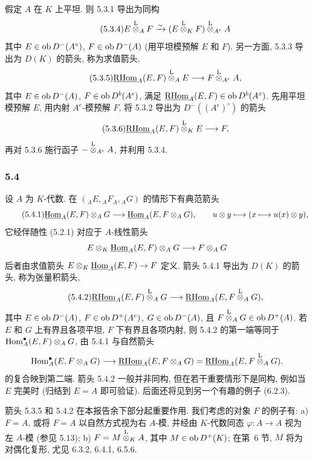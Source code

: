 假定 $A$ 在 $K$ 上平坦. 则 5.3.1 导出为同构
\begin{equation}\tag{5.3.4}
E\overset{\mathrm L}{\otimes}_AF\xrightarrow{\sim}(E\overset{\mathrm L}{\otimes}_KF)\overset{\mathrm L}{\otimes}_{A^e}A
\end{equation}
其中 $E\in\operatorname{ob} D^-(A^\circ)$, $F\in\operatorname{ob} D^-(A)$ (用平坦模预解 $E$ 和 $F$). 另一方面, 5.3.3 导出为 $D(K)$ 的箭头, 称为求值箭头,
\begin{equation}\tag{5.3.5}
\underline{\mathrm{RHom}}_A(E,F)\overset{\mathrm L}{\otimes}_AE\longrightarrow F\overset{\mathrm L}{\otimes}_{A^e}A,
\end{equation}
其中 $E\in\operatorname{ob} D^-(A)$, $F\in\operatorname{ob} D^b(A^e)$, 满足 $\underline{\mathrm{RHom}}_A(E,F)\in\operatorname{ob} D^b(A^\circ)$. 先用平坦模预解 $E$, 用内射 $A^e$-模预解 $F$, 将 5.3.2 导出为 $D^-((A^e)^\circ)$ 的箭头
\begin{equation}\tag{5.3.6}
\underline{\mathrm{RHom}}_A(E,F)\overset{\mathrm L}{\otimes}_KE\longrightarrow F,
\end{equation}
再对 5.3.6 施行函子 $-\overset{\mathrm L}{\otimes}_{A^e}A$, 并利用 5.3.4.

\subsubsection*{5.4}

设 $A$ 为 $K$-代数. 在 $({}_AE,{}_AF_A,{}_AG)$ 的情形下有典范箭头
\begin{equation}\tag{5.4.1}
\underline{\operatorname{Hom}}_A(E,F)\otimes_AG\longrightarrow\underline{\operatorname{Hom}}_A(E,F\otimes_AG),
\qquad u\otimes y\longmapsto(x\longmapsto u(x)\otimes y),
\end{equation}
它经伴随性 (5.2.1) 对应于 $A$-线性箭头
\[
E\otimes_K\underline{\operatorname{Hom}}_A(E,F)\otimes_AG\longrightarrow F\otimes_AG
\]
后者由求值箭头 $E\otimes_K\underline{\operatorname{Hom}}_A(E,F)\to F$ 定义. 箭头 5.4.1 导出为 $D(K)$ 的箭头, 称为张量积箭头,
\begin{equation}\tag{5.4.2}
\underline{\mathrm{RHom}}_A(E,F)\overset{\mathrm L}{\otimes}_AG\longrightarrow\underline{\mathrm{RHom}}_A(E,F\overset{\mathrm L}{\otimes}_AG),
\end{equation}
其中 $E\in\operatorname{ob} D^-(A)$, $F\in\operatorname{ob} D^+(A^e)$, $G\in\operatorname{ob} D^-(A)$, 且 $F\overset{\mathrm L}{\otimes}_AG\in\operatorname{ob} D^+(A)$. 若 $E$ 和 $G$ 上有界且各项平坦, $F$ 下有界且各项内射, 则 5.4.2 的第一端等同于 $\operatorname{Hom}_A^\bullet(E,F)\otimes_AG$, 由 5.4.1 与自然箭头
\[
\operatorname{Hom}_A^\bullet(E,F\otimes_AG)\longrightarrow \underline{\mathrm{RHom}}_A(E,F\otimes_AG)=\underline{\mathrm{RHom}}_A(E,F\overset{\mathrm L}{\otimes}_AG).
\]
的复合映到第二端. 箭头 5.4.2 一般并非同构, 但在若干重要情形下是同构, 例如当 $E$ 完美时 (归结到 $E=A$ 即可验证). 后面还将见到另一个有趣的例子 (6.2.3).

箭头 5.3.5 和 5.4.2 在本报告余下部分起重要作用. 我们考虑的对象 $F$ 的例子有: a) $F=A$, 或将 $F=A$ 以自然方式视为右 $A$-模, 并经由 $K$-代数同态 $\varphi:A\to A$ 视为左 $A$-模 (参见 5.13); b) $F=M\overset{\mathrm L}{\otimes}_KA$, 其中 $M\in\operatorname{ob} D^+(K)$; 在第~6 节, $M$ 将为对偶化复形, 尤见 6.3.2, 6.4.1, 6.5.6.

